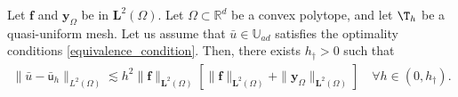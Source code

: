 \documentclass[final]{siamart0216}
\begin{document}
\begin{theorem}
\label{theorem_estimates_control_semi}
Let $\boldsymbol{\mathbf{f}}$ and $\mathbf{y}_{\Omega}$ be in $\mathbf{L}^2(\Omega)$. Let $\Omega \subset \mathbb{R}^d$ be a convex polytope, and let $\T_h$ be a quasi-uniform mesh. Let us assume that $\bar{u} \in \mathbb{U}_{ad}$ satisfies the optimality conditions \eqref{equivalence_condition}. Then, there exists $h_{\dagger}>0$ such that
\begin{align}\label{eq:error_estimate_sd}
\|\bar{u}-\bar{\mathsf{u}}_{h}\|_{L^2(\Omega)}\lesssim h^2\|\mathbf{f}\|_{\mathbf{L}^2(\Omega)}\left[\|\mathbf{f}\|_{\mathbf{L}^2(\Omega)}+\|\mathbf{y}_{\Omega}\|_{\mathbf{L}^2(\Omega)}\right]\quad\forall h\in(0, h_{\dagger}).
\end{align}
\end{theorem}
\end{document}
